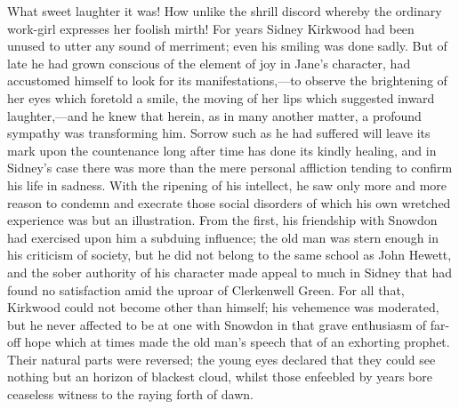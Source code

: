 What sweet laughter it was! How unlike the shrill discord whereby the
ordinary work-girl expresses her foolish mirth! For years Sidney
Kirkwood had been unused to utter any sound of merriment; even his
smiling was done sadly. But of late he had grown conscious of the
element of joy in Jane's character, had accustomed himself to look for
{\protect\hypertarget{46}{}{}}its manifestations,---to observe the
brightening of her eyes which foretold a smile, the moving of her lips
which suggested inward laughter,---and he knew that herein, as in many
another matter, a profound sympathy was transforming him. Sorrow such as
he had suffered will leave its mark upon the countenance long after time
has done its kindly healing, and in Sidney's case there was more than
the mere personal affliction tending to confirm his life in sadness.
With the ripening of his intellect, he saw only more and more reason to
condemn and execrate those social disorders of which his own wretched
experience was but an illustration. From the first, his friendship with
Snowdon had exercised upon him a subduing influence; the old man was
stern enough in his criticism of society, but he did not belong to the
same school as John Hewett, and the sober authority of his character
made appeal to much in Sidney that had found no satisfaction amid the
uproar of Clerkenwell Green. For all that, Kirkwood could not become
other than himself; his vehemence was
{\protect\hypertarget{47}{}{}}moderated, but he never affected to be at
one with Snowdon in that grave enthusiasm of far-off hope which at times
made the old man's speech that of an exhorting prophet. Their natural
parts were reversed; the young eyes declared that they could see nothing
but an horizon of blackest cloud, whilst those enfeebled by years bore
ceaseless witness to the raying forth of dawn.

